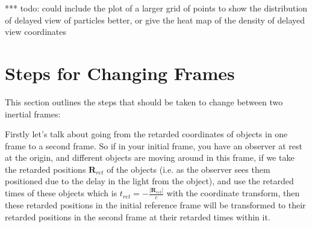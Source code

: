 *** todo: could include the plot of a larger grid of points to show the distribution of delayed view of particles better, or give the heat map of the density of delayed view coordinates





\section{Steps for Changing Frames}

This section outlines the steps that should be taken to change between two inertial frames: \newline

Firstly let's talk about going from the retarded coordinates of objects in one frame to a second frame. So if in your initial frame, you have an observer at rest at the origin, and different objects are moving around in this frame, if we take the retarded positions $\mathbf{R}_{ret}$ of the objects (i.e. as the observer sees them positioned due to the delay in the light from the object), and use the retarded times of these objects which is $t_{ret}=- \frac{|\mathbf{R}_{ret}|}{c}$ with the coordinate transform, then these retarded positions in the initial reference frame will be transformed to their retarded positions in the second frame at their retarded times within it. \newline

